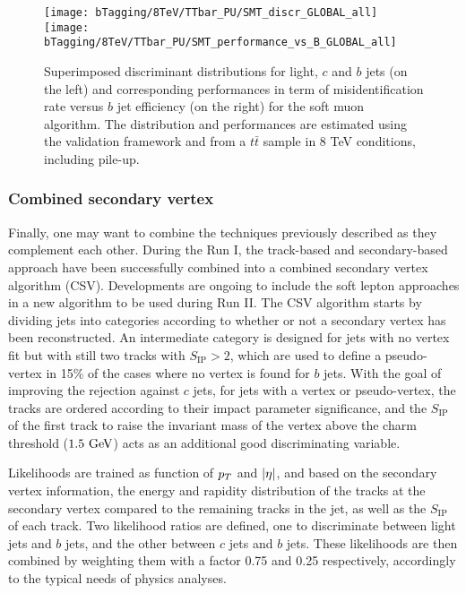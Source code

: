     \begin{figure}[th!]
        \centering
        \begin{minipage}{\textwidth}
        \texttt{[image: bTagging/8TeV/TTbar\_PU/SMT\_discr\_GLOBAL\_all]}
        \texttt{[image: bTagging/8TeV/TTbar\_PU/SMT\_performance\_vs\_B\_GLOBAL\_all]}
        \end{minipage}
        \caption{Superimposed discriminant distributions for light, $c$ and $b$ jets (on
        the left) and corresponding performances in term of misidentification rate versus $b$ jet efficiency
        (on the right) for the soft muon algorithm.
        The distribution and performances are estimated using the validation framework and from
        a $t\bar{t}$ sample in 8 TeV conditions, including pile-up.}
        \label{fig:bTagging/perfSMT}
    \end{figure}

        \subsubsection{Combined secondary vertex}

    Finally, one may want to combine the techniques previously described as they complement
    each other. During the Run I, the track-based and secondary-based approach have been
    successfully combined into a combined secondary vertex algorithm (CSV). Developments are ongoing
    to include the soft lepton approaches in a new algorithm to be used during Run II.
    The CSV algorithm starts by dividing jets into categories according to whether or not a secondary
    vertex has been reconstructed. An intermediate category is designed for jets
    with no vertex fit but with still two tracks with $S_\text{IP} > 2$, which are used to
    define a pseudo-vertex in 15\% of the cases where no vertex is found for $b$ jets.
    With the goal of improving the rejection against $c$ jets, for jets with a vertex or pseudo-vertex,
    the tracks are ordered according to their impact parameter significance, and the
    $S_\text{IP}$ of the first track to raise the invariant mass of the vertex above
    the charm threshold ($1.5 ~\text{GeV}$) acts as an additional good discriminating variable.

    Likelihoods are trained as function of $p_T$ and $\left| \eta \right|$, and based on the secondary vertex information, the energy
    and rapidity distribution of the tracks at the secondary vertex compared to the remaining
    tracks in the jet, as well as the $S_\text{IP}$ of each track. Two likelihood ratios
    are defined, one to discriminate between light jets and $b$ jets, and the other between
    $c$ jets and $b$ jets.
    These likelihoods are then combined by weighting them with a factor 0.75 and 0.25
    respectively, accordingly to the typical needs of physics analyses.

